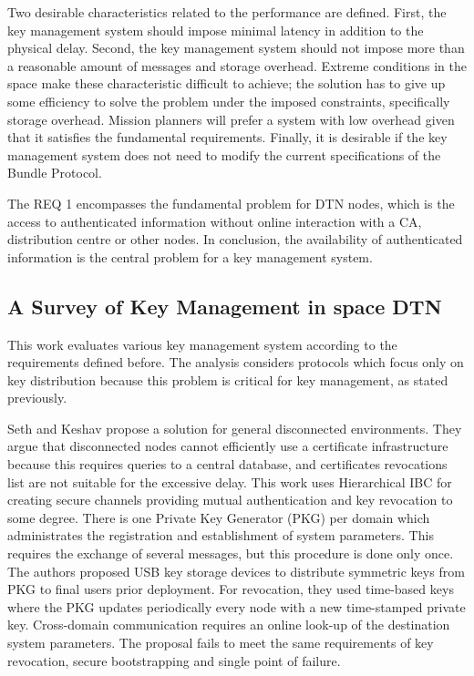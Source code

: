 Two desirable characteristics related to the performance are defined. First, the key management system should impose minimal latency in addition to the physical delay. Second, the key management system should not impose more than a reasonable amount of messages and storage overhead. Extreme conditions in the space make these characteristic difficult to achieve; the solution has to give up some efficiency to solve the problem under the imposed constraints, specifically storage overhead. Mission planners will prefer a system with low overhead given that it satisfies the fundamental requirements. Finally, it is desirable if the key management system does not need to modify the current specifications of the Bundle Protocol. 
  

The REQ 1 encompasses the fundamental problem for DTN nodes, which is the access to authenticated information without online interaction with a CA, distribution centre or other nodes. In conclusion, the availability of authenticated information is the central problem for a key management system. 


\subsection{A Survey of Key Management in space DTN}

This work evaluates various key management system according to the requirements defined before. The analysis considers protocols which focus only on key distribution because this problem is critical for key management, as stated previously.

Seth and Keshav \cite{seth2005practical} propose a solution for general disconnected environments. They argue that disconnected nodes cannot efficiently use a certificate infrastructure because this requires queries to a central database, and certificates revocations list are not suitable for the excessive delay. This work uses Hierarchical IBC for creating secure channels providing mutual authentication and key revocation to some degree. There is one Private Key Generator (PKG) per domain which administrates the registration and establishment of system parameters. This requires the exchange of several messages, but this procedure is done only once. The authors proposed USB key storage devices to distribute symmetric keys from PKG to final users prior deployment. For revocation, they used time-based keys where the PKG updates periodically every node with a new time-stamped private key. Cross-domain communication requires an online look-up of the destination system parameters. The proposal fails to meet the same requirements of key revocation, secure bootstrapping and single point of failure.

